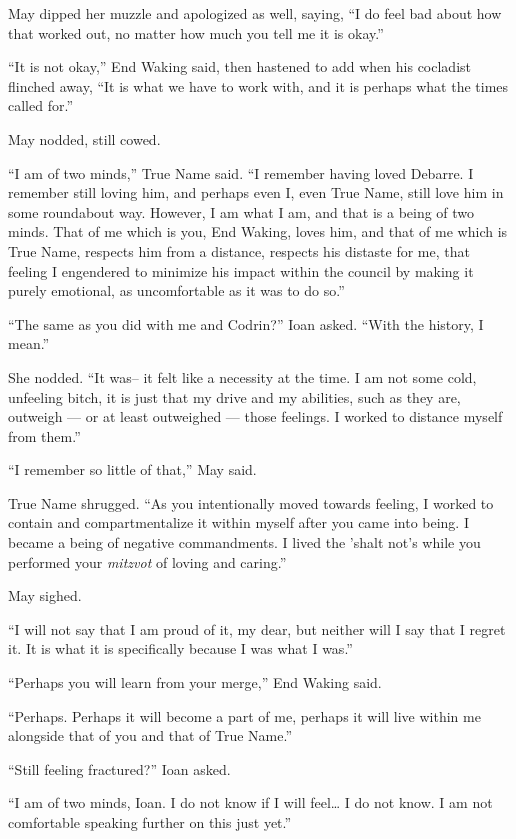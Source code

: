 May dipped her muzzle and apologized as well, saying, ``I do feel bad about how that worked out, no matter how much you tell me it is okay.''

``It is not okay,'' End Waking said, then hastened to add when his cocladist flinched away, ``It is what we have to work with, and it is perhaps what the times called for.''

May nodded, still cowed.

``I am of two minds,'' True Name said. ``I remember having loved Debarre. I remember still loving him, and perhaps even I, even True Name, still love him in some roundabout way. However, I am what I am, and that is a being of two minds. That of me which is you, End Waking, loves him, and that of me which is True Name, respects him from a distance, respects his distaste for me, that feeling I engendered to minimize his impact within the council by making it purely emotional, as uncomfortable as it was to do so.''

``The same as you did with me and Codrin?'' Ioan asked. ``With the history, I mean.''

She nodded. ``It was-- it felt like a necessity at the time. I am not some cold, unfeeling bitch, it is just that my drive and my abilities, such as they are, outweigh — or at least outweighed — those feelings. I worked to distance myself from them.''

``I remember so little of that,'' May said.

True Name shrugged. ``As you intentionally moved towards feeling, I worked to contain and compartmentalize it within myself after you came into being. I became a being of negative commandments. I lived the 'shalt not's while you performed your \emph{mitzvot} of loving and caring.''

May sighed.

``I will not say that I am proud of it, my dear, but neither will I say that I regret it. It is what it is specifically because I was what I was.''

``Perhaps you will learn from your merge,'' End Waking said.

``Perhaps. Perhaps it will become a part of me, perhaps it will live within me alongside that of you and that of True Name.''

``Still feeling fractured?'' Ioan asked.

``I am of two minds, Ioan. I do not know if I will feel\ldots{} I do not know. I am not comfortable speaking further on this just yet.''

